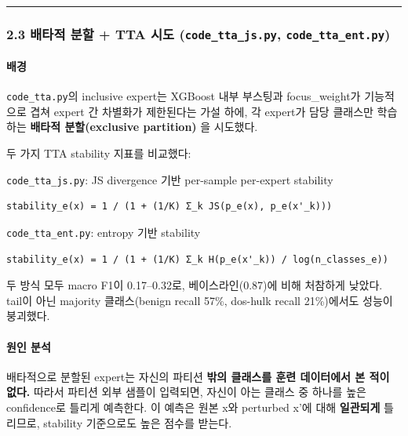 \medskip\hrule\medskip
\subsubsection{2.3 배타적 분할 +\allowbreak{} TTA 시도 (\texttt{code\_\allowbreak{}\allowbreak{}tta\allowbreak{}\_\allowbreak{}\allowbreak{}js.\allowbreak{}py}, \texttt{code\_\allowbreak{}\allowbreak{}tta\allowbreak{}\_\allowbreak{}\allowbreak{}ent.\allowbreak{}py})}
\paragraph{배경}
\texttt{code\_\allowbreak{}\allowbreak{}tta\allowbreak{}.\allowbreak{}py}의 inclusive expert는 XGBoost 내부 부스팅과 focus\_\allowbreak{}weight가 기능적으로 겹쳐 expert 간 차별화가 제한된다는 가설 하에, 각 expert가 담당 클래스만 학습하는 \textbf{배타적 분할(exclusive partition)} 을 시도했다.

두 가지 TTA stability 지표를 비교했다:

\par\noindent \textbullet\enspace \texttt{code\_\allowbreak{}\allowbreak{}tta\allowbreak{}\_\allowbreak{}\allowbreak{}js.\allowbreak{}py}: JS divergence 기반 per-sample per-expert stability


\begin{Verbatim}[breaklines=true,breakanywhere=true,fontsize=\scriptsize]
stability_e(x) = 1 / (1 + (1/K) Σ_k JS(p_e(x), p_e(x'_k)))

\end{Verbatim}

\par\noindent \textbullet\enspace \texttt{code\_\allowbreak{}\allowbreak{}tta\allowbreak{}\_\allowbreak{}\allowbreak{}ent.\allowbreak{}py}: entropy 기반 stability


\begin{Verbatim}[breaklines=true,breakanywhere=true,fontsize=\scriptsize]
stability_e(x) = 1 / (1 + (1/K) Σ_k H(p_e(x'_k)) / log(n_classes_e))

\end{Verbatim}

두 방식 모두 macro F1이 0.17–0.32로, 베이스라인(0.87)에 비해 처참하게 낮았다. tail이 아닌 majority 클래스(benign recall 57\%, dos-hulk recall 21\%)에서도 성능이 붕괴했다.

\paragraph{원인 분석}
배타적으로 분할된 expert는 자신의 파티션 \textbf{밖의 클래스를 훈련 데이터에서 본 적이 없다.} 따라서 파티션 외부 샘플이 입력되면, 자신이 아는 클래스 중 하나를 높은 confidence로 틀리게 예측한다. 이 예측은 원본 x와 perturbed x'에 대해 \textbf{일관되게} 틀리므로, stability 기준으로도 높은 점수를 받는다.

